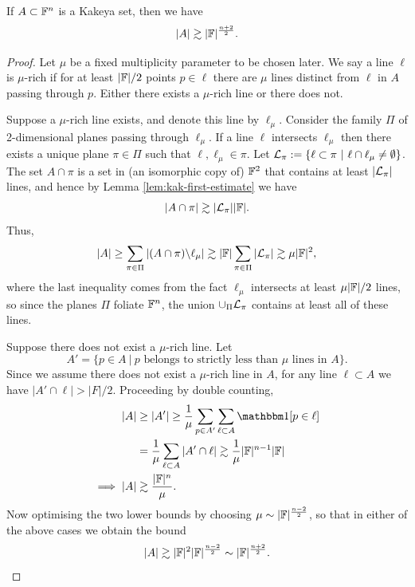 \begin{theorem}
    If $A \subset \mathbb F^n$ is a Kakeya set, then we have
    \[
        |A| \gtrsim |\mathbb F|^{\frac{n+2}{2}}.
    \]
\end{theorem}
\begin{proof}
Let $\mu$ be a fixed multiplicity parameter to be chosen later. We say a line $\ell$ is $\mu$-rich if for at least $|\mathbb F|/2$ points $p\in \ell$ there are $\mu$ lines distinct from $\ell$
in $A$ passing through $p$. Either there exists a $\mu$-rich line or there does not. 

Suppose a $\mu$-rich line exists, and denote this line by $\ell_\mu$. Consider the family $\Pi$ of 2-dimensional planes passing through $\ell_\mu$. 
If a line $\ell$ intersects $\ell_\mu$ then there exists a unique plane $\pi \in \Pi$ such that $\ell, \ell_\mu \in \pi$. 
Let $\mathcal L_\pi := \{\ell \subset \pi \ | \ \ell \cap \ell_\mu \neq \emptyset \}$. The set $A \cap \pi$ is a set in (an isomorphic copy of) $\mathbb F^2$ that contains at least $|\mathcal L_\pi|$
lines, and hence by Lemma \ref{lem:kak-first-estimate} we have
\[
|A \cap \pi| \gtrsim |\mathcal L_\pi| |\mathbb F|.
\]
Thus,
\[
    |A| \geq \sum_{\pi \in \Pi} |(A \cap \pi) \backslash \ell_\mu| \gtrsim |\mathbb F| \sum_{\pi \in \Pi} |\mathcal L_\pi| \gtrsim \mu |\mathbb F|^2,
\]
where the last inequality comes from the fact $\ell_\mu$ intersects at least $\mu |\mathbb F|/2$ lines, so since the planes $\Pi$ foliate $\mathbb F^n$, the union $\cup_\Pi \mathcal L_\pi$ contains at least all of these lines.

Suppose there does not exist a $\mu$-rich line. Let 
\[
    A' = \{p \in A \ | \ p \text{ belongs to strictly less than } \mu \text{ lines in }A \}.
\]
Since we assume there does not exist a $\mu$-rich line in $A$, for any line $\ell \subset A$ we have $|A' \cap \ell| > |F|/2$. 
Proceeding by double counting, 
\begin{align*}
    |A| &\geq |A'|\geq \frac{1}{\mu} \sum_{p \in A'} \sum_{\ell \subset A} \OO[p \in \ell] \\
    &= \frac{1}{\mu} \sum_{\ell \subset A} |A' \cap \ell| \gtrsim \frac{1}{\mu} |\FF|^{n-1}|\FF|\\
    \implies |A| &\gtrsim \frac{|\FF|^n}{\mu}.
\end{align*}
Now optimising the two lower bounds by choosing $\mu \sim |\mathbb F|^{\frac{n-2}{2}}$, so that in either of the above cases we obtain the bound
\[
    |A| \gtrsim |\mathbb F|^2|\mathbb F|^{\frac{n-2}{2}} \sim |\mathbb F|^{\frac{n+2}{2}}.
\]
\end{proof}

